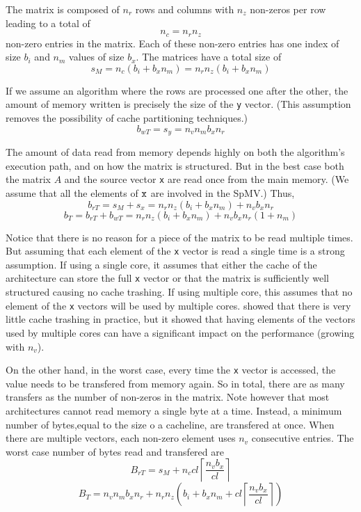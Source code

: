 \documentclass[10pt,conference,compsocconf]{IEEEtran}
\newcommand{\ceil}[1]{\left\lceil#1\right\rceil}
\begin{document}
The matrix is composed of $n_r$ rows and columns with $n_z$ non-zeros
per row leading to a total of $$n_c = n_r n_z$$ non-zero entries in
the matrix. Each of these non-zero entries has one index of size $b_i$
and $n_m$ values of size $b_x$. The matrices have a total size
of $$s_M = n_c (b_i + b_x n_m) = n_r n_z (b_i + b_x n_m)$$

If we assume an algorithm where the rows are processed one after
the other, the amount of memory written is precisely the
size of the {\tt y} vector. (This assumption removes the possibility of
cache partitioning techniques.) $$b_{wT} = s_y = n_v n_m b_x n_r$$

The amount of data read from memory depends highly on both the algorithm's
execution path, and on %
how the matrix is structured. But in the best case
both the matrix $A$ %
and the source vector {\tt x} are read once
from the main memory. (We assume that all the elements of $\tt x$ are involved
in the SpMV.)  %
Thus, $$b_{rT} = s_M + s_x = n_r n_z
(b_i + b_x n_m) + n_v b_x n_r$$
 $$b_T = b_{rT} + b_{wT} =  n_r n_z (b_i + b_x n_m) + n_v b_x n_r (1 + n_m)$$

Notice that there is no reason for a piece of the matrix to be read
multiple times. But assuming that each element of the {\tt x} vector
is read a single time is a strong assumption. If using a single core,
it assumes that either the cache of the architecture can store the full
{\tt x} vector or that the matrix is sufficiently well structured 
causing no cache trashing. If using multiple core, this assumes that
no element of the {\tt x} vectors will be used by multiple
cores. \cite{Saule12} showed that there is very little cache trashing
in practice, but it showed that having elements of the vectors used by
multiple cores can have a significant impact on the performance
(growing with $n_v$).

On the other hand, in the worst case, every time the {\tt x} vector is
accessed, the value needs to be transfered from memory again. So in
total, there are as many transfers as the number of non-zeros in the
matrix. Note however that most architectures cannot read memory a single 
byte at a time. Instead, a minimum number of bytes,equal to the size o a cacheline, 
are transfered at once. 
When there are multiple
vectors, each non-zero element uses $n_v$ consecutive entries. The
worst case number of bytes read and transfered are 
$$B_{rT} = s_M + n_c cl \ceil{\frac{n_vb_x}{cl}} $$ 
$$B_T = n_v n_m b_x n_r + n_r n_z \left ( b_i + b_x n_m +  cl \ceil{\frac{n_vb_x}{cl}} \right)$$
\end{document}

